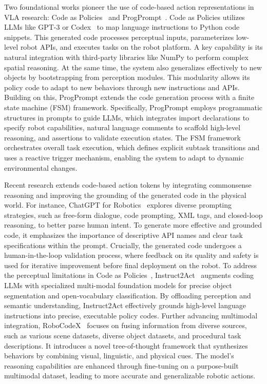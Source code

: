 \documentclass[10pt, a4paper, logo, copyright]{googledeepmind} %
\begin{document}
Two foundational works pioneer the use of code-based action representations in VLA research: Code as Policies~\cite{liang2023code} and ProgPrompt~\cite{Singh2022ProgPromptGS}. Code as Policies utilizes LLMs like GPT-3 or Codex~\cite{chen2021evaluating} to map language instructions to Python code snippets. This generated code processes perceptual inputs, parameterizes low-level robot APIs, and executes tasks on the robot platform. A key capability is its natural integration with third-party libraries like NumPy to perform complex spatial reasoning. At the same time, the system also generalizes effectively to new objects by bootstrapping from perception modules. This modularity allows its policy code to adapt to new behaviors through new instructions and APIs. Building on this, ProgPrompt extends the code generation process with a finite state machine (FSM) framework. Specifically, ProgPrompt employs programmatic structures in prompts to guide LLMs, which integrates import declarations to specify robot capabilities, natural language comments to scaffold high-level reasoning, and assertions to validate execution states. The FSM framework orchestrates overall task execution, which defines explicit subtask transitions and uses a reactive trigger mechanism, enabling the system to adapt to dynamic environmental changes.

Recent research extends code-based action tokens by integrating commonsense reasoning and improving the grounding of the generated code in the physical world. For instance, ChatGPT for Robotics~\cite{Vemprala2023ChatGPTFR} explores diverse prompting strategies, such as free-form dialogue, code prompting, XML tags, and closed-loop reasoning, to better parse human intent. To generate more effective and grounded code, it emphasizes the importance of descriptive API names and clear task specifications within the prompt. Crucially, the generated code undergoes a human-in-the-loop validation process, where feedback on its quality and safety is used for iterative improvement before final deployment on the robot. To address the perceptual limitations in Code as Policies~\cite{liang2023code}, Instruct2Act~\cite{Huang2023Instruct2ActMM} augments coding LLMs with specialized multi-modal foundation models for precise object segmentation and open-vocabulary classification. By offloading perception and semantic understanding, Instruct2Act effectively grounds high-level language instructions into precise, executable policy codes. Further advancing multimodal integration, RoboCodeX~\cite{10.5555/3692070.3693552} focuses on fusing information from diverse sources, such as various scene datasets, diverse object datasets, and procedural task descriptions. It introduces a novel tree-of-thought framework that synthesizes behaviors by combining visual, linguistic, and physical cues. The model's reasoning capabilities are enhanced through fine-tuning on a purpose-built multimodal dataset, leading to more accurate and generalizable robotic actions.
\end{document}
